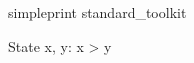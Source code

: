 \documentclass{article}
\begin{document}
\begin{zsection}
\SECTION simpleprint \parents 
			 standard\_toolkit 
\end{zsection}

\begin{schema}{State}
   x, y: \nat
\where
   x > y
\end{schema}

\end{document}
